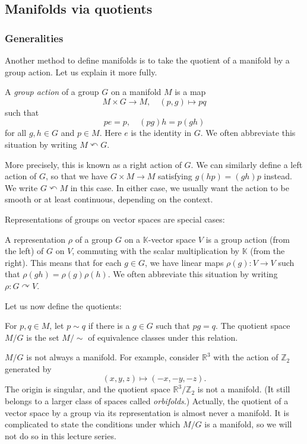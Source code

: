 \documentclass[12pt]{article}
\numberwithin{equation}{section}
\numberwithin{figure}{section}
\theoremstyle{remark}
\def\bK{\mathbb{K}}
\def\bR{\mathbb{R}}
\def\bZ{\mathbb{Z}}
\begin{document}
\subsection{Manifolds via quotients}
\label{sec:quotient}
\subsubsection{Generalities}
Another method to define manifolds is to 
take the quotient of a manifold by a group action. 
Let us explain it more fully.
\begin{definition}
A \emph{group action} of a group $G$ on a manifold $M$ is a map \begin{equation}
  M\times G \to M, \quad (p, g) \mapsto p q
\end{equation} such that \begin{equation}
   p e = p, \quad  (p  g) h = p (gh)
\end{equation} for all $g,h\in G$ and $p\in M$.
Here $e$ is the identity in $G$.
We often abbreviate this situation by writing $M \curvearrowleft G$.
\end{definition}

More precisely, this is known as a right action of $G$.
We can similarly define a left action of $G$, so that 
we have $G\times M\to M$ satisfying $g(hp)=(gh)p$ instead.
We write $G\curvearrowleft M$ in this case.
In either case, we usually want the action to be smooth or at least continuous,
depending on the context.

Representations of groups on vector spaces are special cases:
\begin{definition}
  A representation $\rho$ of a group $G$ on a $\bK$-vector space $V$ is a group action (from the left) of $G$ on $V$, commuting with the scalar multiplication by $\bK$ (from the right).
  This means that for each $g\in G$, we have linear maps $\rho(g):V\to V$ such that $\rho(gh)=\rho(g)\rho(h)$.    
  We often abbreviate this situation by writing $\rho: G\curvearrowright V$.
\end{definition}

Let us now define the quotients:
\begin{definition}
For $p,q\in M$, let $p\sim q$ if there is a $g\in G$ such that $p g = q$.
The quotient space $M/G$ is the set $M/\sim$ of equivalence classes 
under this relation.
\end{definition}

$M/G$ is not always a manifold.
For example, consider $\bR^3$ with the action of $\bZ_2$ generated by 
\begin{equation}
(x,y,z) \mapsto (-x,-y,-z).
\end{equation}
The origin is singular, and the quotient space $\bR^3/\bZ_2$ is not a manifold.
(It still belongs to a larger class of spaces called \emph{orbifolds}.)
Actually, the quotient of a vector space by a group via its representation is almost never a manifold.
It is complicated to state the conditions under which $M/G$ is a manifold,
so we will not do so in this lecture series.
\end{document}
